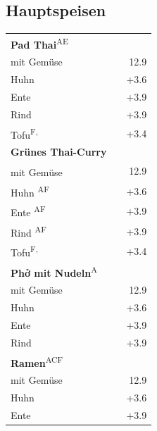 \documentclass[a4paper,12pt]{article}
\newcommand{\vegan}{\textbf{\scriptsize \color{vegan}{Vegan}}}
\begin{document}
\begin{multicols}{2}
\section*{Hauptspeisen}
\begin{tabular}{Lrr}
\textbf{Pad Thai}\textsuperscript{{\scriptsize AE}}\\
\hspace{0.4cm}mit Gemüse & & 12.9\\
\hspace{0.4cm}Huhn & & +3.6\\
\hspace{0.4cm}Ente & & +3.9\\
\hspace{0.4cm}Rind & & +3.9\\
\hspace{0.4cm}Tofu\textsuperscript{{\scriptsize F, \vegan}} & & +3.4\\
\textbf{Grünes Thai-Curry}\\
\hspace{0.4cm}mit Gemüse\textsuperscript{\vegan} & & 12.9\\
\hspace{0.4cm}Huhn \textsuperscript{{\scriptsize AF}} & & +3.6\\
\hspace{0.4cm}Ente \textsuperscript{{\scriptsize AF}} & & +3.9\\
\hspace{0.4cm}Rind \textsuperscript{{\scriptsize AF}} & & +3.9\\
\hspace{0.4cm}Tofu\textsuperscript{{\scriptsize F, \vegan}} & & +3.4\\
\textbf{Phở mit Nudeln}\textsuperscript{{\scriptsize A}}\\
\hspace{0.4cm}mit Gemüse & & 12.9\\
\hspace{0.4cm}Huhn & & +3.6\\
\hspace{0.4cm}Ente & & +3.9\\
\hspace{0.4cm}Rind & & +3.9\\
\textbf{Ramen}\textsuperscript{{\scriptsize ACF}}\\
\hspace{0.4cm}mit Gemüse & & 12.9\\
\hspace{0.4cm}Huhn & & +3.6\\
\hspace{0.4cm}Ente & & +3.9\\

\end{tabular}
\end{multicols}
\end{document}
